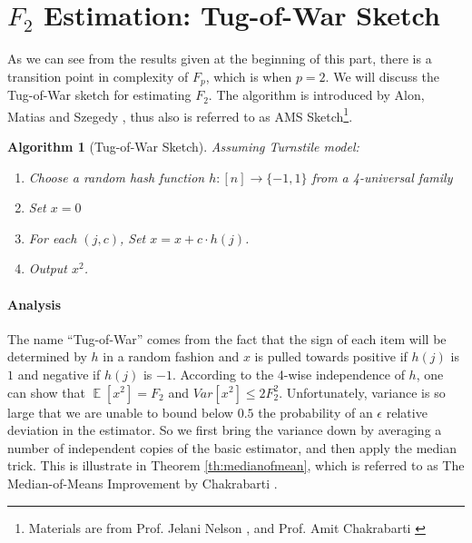 \documentclass[11pt]{article}
\theoremstyle{plain}
\newtheorem{algorithm}{Algorithm}[section]
\DeclareMathOperator*{\E}{\mathbb{E}}
\begin{document}
\section{$F_2$ Estimation: Tug-of-War Sketch}

As we can see from the results given at the beginning of this part, there is a 
transition point in complexity of $F_p$, which is when $p=2$. We will discuss 
the Tug-of-War sketch for estimating $F_2$. The algorithm is introduced by 
Alon, Matias and Szegedy \cite{AMS99}, thus also is referred to as AMS 
Sketch\footnote{Materials are from 
	Prof. Jelani Nelson  \cite{Nel2015-web}, and Prof. Amit 
	Chakrabarti  \cite{Cha2015-notes}}.


\begin{algorithm}[Tug-of-War Sketch]
\label{al:tugofwar}
Assuming Turnstile model:
\begin{enumerate}
	\item Choose a random hash function $h : [n]\rightarrow \{-1,1\}$ from a 
	4-universal family
	\item Set $x=0$
	\item For each $(j,c)$, Set $x=x+c\cdot h(j)$.
	\item Output $x^2$.
\end{enumerate}
\end{algorithm}

\paragraph{Analysis}
The name ``Tug-of-War'' comes from the fact that the sign of each item will 
be determined by $h$ in a random fashion and $x$ is pulled towards positive 
if $h(j)$ is $1$ and negative if $h(j)$ is $-1$. According to the 4-wise 
independence of $h$, one can show that $\E [x^2]=F_2$ and 
$Var[x^2]\leq2F_2^2$. Unfortunately, variance is so large that we are unable 
to bound below $0.5$ the probability of an $\epsilon$ relative deviation in 
the estimator. So we first bring the variance down by averaging a number of 
independent copies of the basic estimator, and then apply
the median trick. This is illustrate in Theorem \ref{th:medianofmean}, which is 
referred to as The 
Median-of-Means Improvement by Chakrabarti  \cite{Cha2015-notes}.
\end{document}
